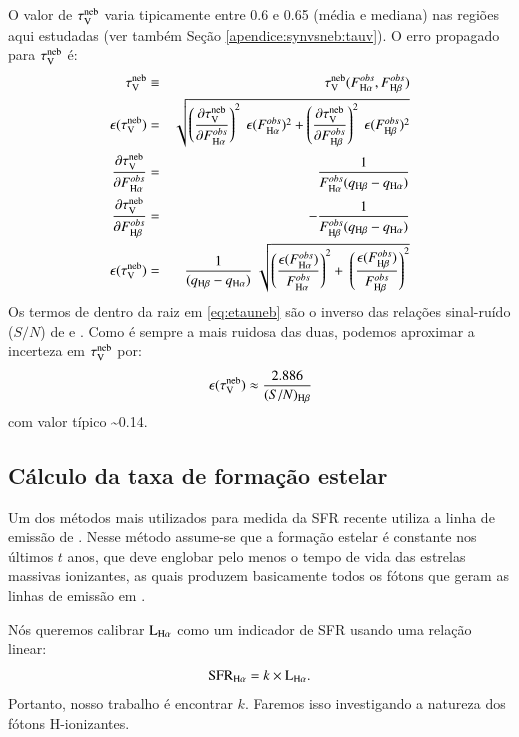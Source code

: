 O valor de $\tau_{\mathrm{V}}^{\mathrm{neb}}$ varia tipicamente entre 0.6 e 0.65 (média e mediana) nas regiões aqui estudadas (ver também Seção \ref{apendice:synvsneb:tauv}).
O erro propagado para $\tau_{\mathrm{V}}^{\mathrm{neb}}$ é:
\begin{eqnarray}
	\tauVN &\equiv& \tauVN(F_{\Ha}^{obs}, F_{\Hb}^{obs}) \\
	\epsilon (\tauVN) &=& \sqrt{\left(\del{\tauVN}{F_{\Ha}^{obs}}\right)^2 \
\epsilon (F_{\Ha}^{obs})^2 + \left(\del{\tauVN}{F_{\Hb}^{obs}}\right)^2 \
\epsilon (F_{\Hb}^{obs})^2 } \\
	\del{\tauVN}{F_{\Ha}^{obs}} &=& \frac{1}{F_{\Ha}^{obs} (q_{\Hb} - q_{\Ha})} \\
	\del{\tauVN}{F_{\Hb}^{obs}} &=& - \frac{1}{F_{\Hb}^{obs} (q_{\Hb} - q_{\Ha})} \\
	\epsilon (\tauVN) &=& \frac{1}{(q_{\Hb} - q_{\Ha})} \
\sqrt{\left(\frac{\epsilon (F_{\Ha}^{obs})}{F_{\Ha}^{obs}}\right)^2 + \
\left(\frac{\epsilon (F_{\Hb}^{obs})}{F_{\Hb}^{obs}}\right)^2 }
	\label{eq:etauneb}
\end{eqnarray}
\noindent Os termos de dentro da raiz em \eqref{eq:etauneb} são o inverso das relações sinal-ruído ($S/N$) de \Ha e \Hb. Como \Hb é sempre a mais ruidosa das duas, podemos aproximar a incerteza em $\tau_{\mathrm{V}}^{\mathrm{neb}}$ por:
\begin{equation}
	\epsilon (\tauVN) \approx \frac{2.886}{(S/N)_{\Hb}}
	\label{eq:etaunebaprox}
\end{equation}
\noindent com valor típico \sim 0.14.

\subsection{Cálculo da taxa de formação estelar}
\label{apendice:EmLinesDataCube:props:SFR}
Um dos métodos mais utilizados para medida da SFR recente utiliza a linha de emissão de \Ha. Nesse método assume-se que a formação estelar é constante nos últimos $t$ anos, que deve englobar pelo menos o tempo de vida das estrelas massivas ionizantes, as quais produzem basicamente todos os fótons que geram as linhas de emissão em \Ha.

Nós queremos calibrar $\LHalpha$ como um indicador de SFR usando uma relação linear:
\begin{equation}
	\mathrm{SFR}_{\Ha} = k \times \LHalpha.
	\label{eq:SFRHa}
\end{equation}
\noindent Portanto, nosso trabalho é encontrar $k$. Faremos isso investigando a natureza dos
fótons H-ionizantes.

